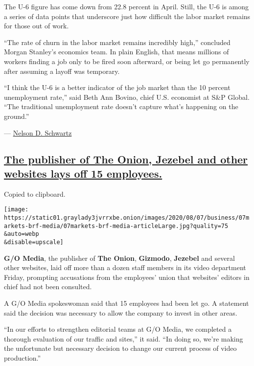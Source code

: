 The U-6 figure has come down from 22.8 percent in April. Still, the U-6
is among a series of data points that underscore just how difficult the
labor market remains for those out of work.

``The rate of churn in the labor market remains incredibly high,''
concluded Morgan Stanley's economics team. In plain English, that means
millions of workers finding a job only to be fired soon afterward, or
being let go permanently after assuming a layoff was temporary.

``I think the U-6 is a better indicator of the job market than the 10
percent unemployment rate,'' said Beth Ann Bovino, chief U.S. economist
at S\&P Global. ``The traditional unemployment rate doesn't capture
what's happening on the ground.''

---
\href{https://www.nytimes3xbfgragh.onion/by/nelson-d-schwartz}{Nelson D.
Schwartz}

\hypertarget{the-publisher-of-the-onion-jezebel-and-other-websites-lays-off-15-employees}{%
\subsection{\texorpdfstring{\protect\hyperlink{the-publisher-of-the-onion-jezebel-and-other-websites-lays-off-15-employees}{The
publisher of The Onion, Jezebel and other websites lays off 15
employees.}}{The publisher of The Onion, Jezebel and other websites lays off 15 employees.}}\label{the-publisher-of-the-onion-jezebel-and-other-websites-lays-off-15-employees}}

Copied to clipboard.

\texttt{[image: https://static01.graylady3jvrrxbe.onion/images/2020/08/07/business/07markets-brf-media/07markets-brf-media-articleLarge.jpg?quality=75\\\&auto=webp\\\&disable=upscale]}

\textbf{G/O Media}, the publisher of \textbf{The Onion},
\textbf{Gizmodo}, \textbf{Jezebel} and several other websites, laid off
more than a dozen staff members in its video department Friday,
prompting accusations from the employees' union that websites' editors
in chief had not been consulted.

A G/O Media spokeswoman said that 15 employees had been let go. A
statement said the decision was necessary to allow the company to invest
in other areas.

``In our efforts to strengthen editorial teams at G/O Media, we
completed a thorough evaluation of our traffic and sites,'' it said.
``In doing so, we're making the unfortunate but necessary decision to
change our current process of video production.''

